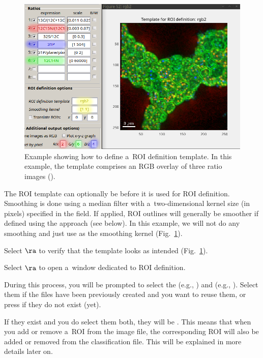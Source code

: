 \begin{figure}[!ht]
\centering
\includegraphics[scale=0.4]{figs3/LANS-roi-template}
\caption{\label{fig:roi-template}%
Example showing how to define a~ROI definition template. In this example, the template comprises an RGB overlay of three ratio images ().}
\end{figure}

\bul The ROI template can optionally be  before it is used for ROI definition. Smoothing is done using a median filter with a~two-dimensional kernel size (in pixels) specified in the  field. If applied, ROI outlines will generally be smoother if defined using the  approach (see below). In this example, we will not do any smoothing and just use \ttt{[1 1]} as the smoothing kernel (Fig.~\ref{fig:roi-template}).

\s Select  $\ra$  to verify that the template looks as intended (Fig.~\ref{fig:roi-template}). 

\s Select  $\ra$  to open a~window dedicated to ROI definition. 

\nb
\bul During this process, you will be prompted to select the  (e.g., ) and  (e.g., ). Select them if the files have been previously created and you want to reuse them, or press  if they do not exist (yet).

\bul If they exist and you do select them both, they will be . This means that when you add or remove a~ROI from the image file, the corresponding ROI will also be added or removed from the classification file. This will be explained in more details later on.

